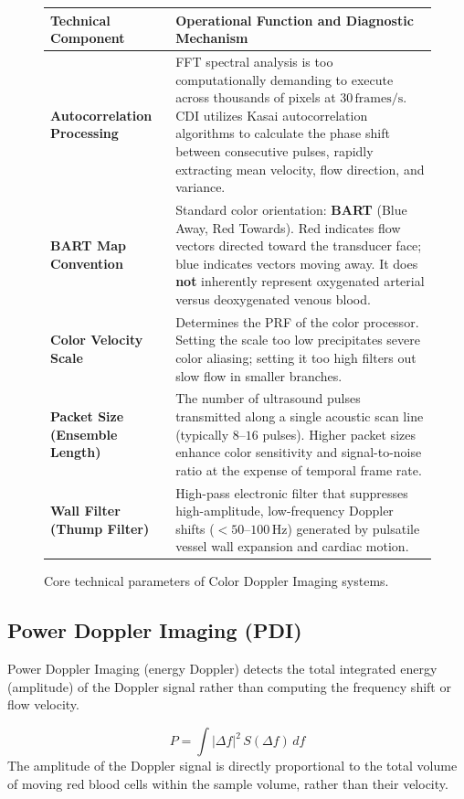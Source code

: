 \documentclass[11pt,a4paper]{article}
\begin{document}
\begin{figure}[htbp]
\centering
\begin{tabular}{lp{11.5cm}}
\toprule
\textbf{Technical Component} & \textbf{Operational Function and Diagnostic Mechanism} \\
\midrule
\textbf{Autocorrelation Processing} & FFT spectral analysis is too computationally demanding to execute across thousands of pixels at $30\,\text{frames/s}$. CDI utilizes Kasai autocorrelation algorithms to calculate the phase shift between consecutive pulses, rapidly extracting mean velocity, flow direction, and variance. \\
\textbf{BART Map Convention} & Standard color orientation: \textbf{BART} (Blue Away, Red Towards). Red indicates flow vectors directed toward the transducer face; blue indicates vectors moving away. It does \textbf{not} inherently represent oxygenated arterial versus deoxygenated venous blood. \\
\textbf{Color Velocity Scale} & Determines the PRF of the color processor. Setting the scale too low precipitates severe color aliasing; setting it too high filters out slow flow in smaller branches. \\
\textbf{Packet Size (Ensemble Length)} & The number of ultrasound pulses transmitted along a single acoustic scan line (typically $8\text{--}16$ pulses). Higher packet sizes enhance color sensitivity and signal-to-noise ratio at the expense of temporal frame rate. \\
\textbf{Wall Filter (Thump Filter)} & High-pass electronic filter that suppresses high-amplitude, low-frequency Doppler shifts ($< 50\text{--}100\,\text{Hz}$) generated by pulsatile vessel wall expansion and cardiac motion. \\
\bottomrule
\end{tabular}
\caption{Core technical parameters of Color Doppler Imaging systems.}
\label{tab:color_doppler_tech}
\end{figure}

\subsection{Power Doppler Imaging (PDI)}

Power Doppler Imaging (energy Doppler) detects the total integrated energy (amplitude) of the Doppler signal rather than computing the frequency shift or flow velocity.

\begin{equation}
    P = \int |\Delta f|^2 \, S(\Delta f) \, df
\end{equation}
The amplitude of the Doppler signal is directly proportional to the total volume of moving red blood cells within the sample volume, rather than their velocity.
\end{document}
